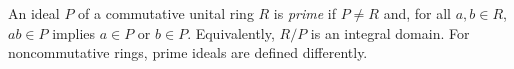 
An ideal $P$ of a commutative unital ring $R$ is \emph{prime} if $P\ne R$ and, for all $a,b\in R$, $ab\in P$ implies $a\in P$ or $b\in P$. Equivalently, $R/P$ is an integral domain. For noncommutative rings, prime ideals are defined differently.
